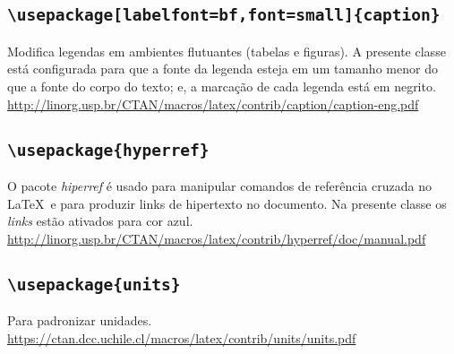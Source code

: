 \subsection*{\texttt{\textbackslash usepackage[labelfont=bf,font=small]\{caption\}}}
Modifica legendas em ambientes flutuantes (tabelas e figuras).
A presente classe está configurada para que a fonte da legenda esteja em um 
tamanho menor do que a fonte do corpo do texto; e, a marcação de cada legenda 
está em negrito.\\
{\small\url{http://linorg.usp.br/CTAN/macros/latex/contrib/caption/caption-eng.pdf}}

\subsection*{\texttt{\textbackslash usepackage\{hyperref\}}}
O pacote \emph{hiperref} é usado para manipular comandos de referência cruzada
no \LaTeX\ e para produzir links de hipertexto no documento.
Na presente classe os \emph{links} estão ativados para cor azul.\\
{\small\url{http://linorg.usp.br/CTAN/macros/latex/contrib/hyperref/doc/manual.pdf}}

\subsection*{\texttt{\textbackslash usepackage\{units\}}}
Para padronizar unidades.\\
{\small\url{https://ctan.dcc.uchile.cl/macros/latex/contrib/units/units.pdf}}
